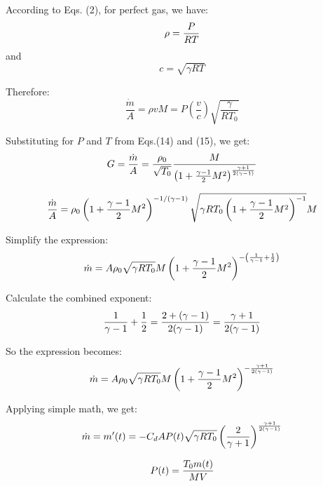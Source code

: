 According to Eqs. (2), for perfect gas, we have:
\begin{equation}\notag
    \rho=\frac{P}{RT}
\end{equation}
and
\begin{equation}
    c=\sqrt{\gamma RT}
\end{equation}

Therefore:
\begin{equation}
    \frac{\dot{m}}{A} = \rho v M = P \left(\frac{v}{c}\right)\sqrt{\frac{\gamma}{RT_0}}
\end{equation}

Substituting for $P$ and $T$ from Eqs.(14) and (15), we get:
\begin{equation}\notag
    G=\frac{\dot{m}}{A}=\frac{\rho_0}{\sqrt{T_0}} \frac{M}{\left(1+\frac{\gamma -1}{2}M^2\right)^\frac{\gamma+1}{2(\gamma-1)}}
\end{equation}

\begin{equation}\notag
\frac{\dot{m}}{A}  = \rho_0 \left(1 + \frac{\gamma - 1}{2} M^2 \right)^{-1/(\gamma - 1)}  \sqrt{\gamma R T_0 \left(1 + \frac{\gamma - 1}{2} M^2 \right)^{-1}} M
\end{equation}

Simplify the expression:
\begin{equation}\notag
\dot{m} = A\rho_0 \sqrt{\gamma R T_0} M \left(1 + \frac{\gamma - 1}{2} M^2 \right)^{-\left(\frac{1}{\gamma - 1} + \frac{1}{2}\right)}
\end{equation}

Calculate the combined exponent:
\begin{equation}\notag
\frac{1}{\gamma - 1} + \frac{1}{2} = \frac{2 + (\gamma - 1)}{2(\gamma - 1)} = \frac{\gamma + 1}{2(\gamma - 1)}
\end{equation}

So the expression becomes:
\begin{equation}\notag
\dot{m}= A\rho_0 \sqrt{\gamma R T_0} M \left(1 + \frac{\gamma - 1}{2} M^2 \right)^{-\frac{\gamma + 1}{2(\gamma - 1)}}
\end{equation}

Applying simple math, we get:
\begin{equation}\notag
\dot{m}=m'(t) = -C_d A P(t) \sqrt{\gamma R T_0} \left( \frac{2}{\gamma + 1} \right)^{\frac{\gamma + 1}{2(\gamma - 1)}}
\end{equation}

\begin{equation}\notag
    P(t)=\frac{T_0 m(t)}{MV}
\end{equation}

